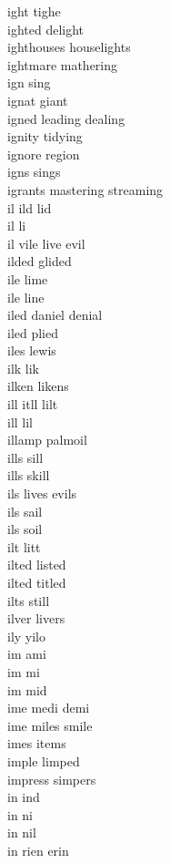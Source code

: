 ight tighe \\
ighted delight \\
ighthouses houselights \\
ightmare mathering \\
ign sing \\
ignat giant\\
igned leading dealing  \\
ignity tidying \\
ignore region\\
igns sings \\
igrants mastering streaming  \\
il ild lid \\
il li\\
il vile live evil  \\
ilded glided \\
ile lime \\
ile line \\
iled daniel denial  \\
iled plied \\
iles lewis \\
ilk lik\\
ilken likens \\
ill itll lilt \\
ill lil\\
illamp palmoil \\
ills sill\\
ills skill \\
ils lives evils  \\
ils sail \\
ils soil \\
ilt litt \\
ilted listed \\
ilted titled \\
ilts still \\
ilver livers \\
ily yilo \\
im ami \\
im mi\\
im mid \\
ime medi demi \\
ime miles smile  \\
imes items \\
imple limped \\
impress simpers\\
in ind \\
in ni\\
in nil \\
in rien erin  \\
